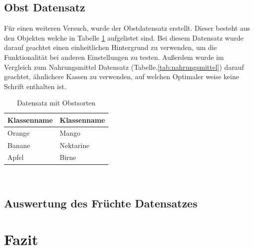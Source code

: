 \documentclass[a4paper,12pt,oneside]{article}
\begin{document}
\subsection{Obst Datensatz}
Für einen weiteren Versuch, wurde der Obstdatensatz erstellt. Dieser besteht aus den Objekten welche in Tabelle \ref{tab:obst} aufgelistet sind. Bei diesem Datensatz wurde darauf geachtet einen einheitlichen Hintergrund zu verwenden, um die Funktionalität bei anderen Einstellungen zu testen. Außerdem wurde im Vergleich zum Nahrungsmittel Datensatz (Tabelle.\ref{tab:nahrungsmittel}) darauf geachtet, ähnlichere Kassen zu verwenden, auf welchen Optimaler weise keine Schrift enthalten ist.
\begin{table}
[h]
\caption{Datensatz mit Obstsorten}
\centering
\begin{tabular}{|l|l|}
\hline
Klassenname & Klassenname\\
\hline
Orange & Mango\\
Banane & Nektarine\\
Apfel & Birne\\
\hline
\end{tabular}
\label{tab:obst}
\end{table}\\ 
\subsection{Auswertung des Früchte Datensatzes}
  \newpage
  \section{Fazit}
  \newpage
  \printbibliography
  \newpage
\end{document}
